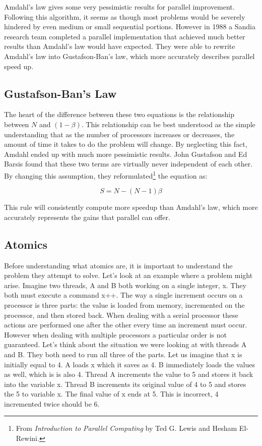 \documentclass{article}
\newcommand{\comp}[1]{{\ttfamily #1}}
\begin{document}
    Amdahl's law gives some very pessimistic results for parallel improvement. Following this algorithm, it seems as though most problems would be severely hindered by even medium or small sequential portions. However in 1988 a Sandia research team completed a parallel implementation that achieved much better results than Amdahl's law would have expected. They were able to rewrite Amdahl's law into Gustafson-Ban's law, which more accurately describes parallel speed up.

    \subsection{Gustafson-Ban's Law}
    The heart of the difference between these two equations is the relationship between $N$ and $(1 - \beta)$.\done{} This relationship can be best understood as the simple understanding that as the number of processors increases or decreases, the amount of time it takes to do the problem will change. By neglecting this fact, Amdahl ended up with much more pessimistic results. John Gustafson and Ed Barsis found that these two terms are virtually never independent of each other. By changing this assumption, they reformulated\footnote{From {\it Introduction to Parallel Computing} by Ted G. Lewis and Hesham El-Rewini.} the equation as:

    $$S = N - (N - 1)\beta$$

    This rule will consistently compute more speedup than Amdahl's law, which more accurately represents the gains that parallel can offer.
    
    \subsection{Atomics}
    Before understanding what atomics are, it is important to understand the problem they attempt to solve. Let's look at an example where a problem might arise. Imagine two threads, A and B both working on a single integer, \comp{x}. They both must execute a command \comp{x++}. The way a single increment occurs on a processor is three parts: the value is loaded from memory, incremented on the processor, and then stored back. When dealing with a serial processor these actions are performed one after the other every time an increment must occur. However when dealing with multiple processors a particular order is not guaranteed. Let's think about the situation we were looking at with threads A and B. They both need to run all three of the parts. Let us imagine that \comp{x} is initially equal to 4. A loads \comp{x} which it saves as 4. B immediately loads the values as well, which is is also 4. Thread A increments the value to 5 and stores it back into the variable \comp{x}. Thread B increments its original value of 4 to 5 and stores the 5 to variable \comp{x}. The final value of \comp{x} ends at 5. This is incorrect, 4 incremented twice should be 6.
    
\end{document}
